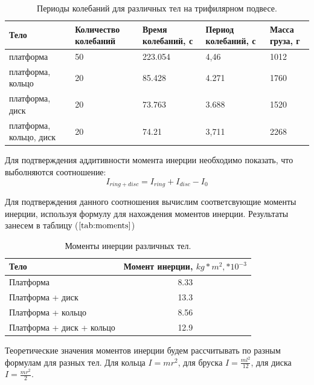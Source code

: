 \documentclass[a4paper,12pt]{article} %
\begin{document}
\begin{table}[ht!]
\begin{center}
\begin{tabular}{| p{65pt} | p{65pt} | p{55pt} | p{60pt}  | p{60pt} |}
					\hline
					Тело & Количество колебаний & Время колебаний, с & Период колебаний, с & Масса груза, г \\ \hline
					платформа & 50 & 223.054 & 4,46 & 1012 \\ \hline
					платформа, кольцо & 20 & 85.428 & 4.271 & 1760 \\ \hline
					платформа, диск & 20 & 73.763 & 3.688 & 1520 \\ \hline
					платформа, кольцо, диск & 20 & 74.21 & 3,711 & 2268 \\
					\hline
\end{tabular}
\end{center} 
\caption{Периоды колебаний для различных тел на трифилярном подвесе.}
\label{tab:periods_diff_body}
\end{table}
		
		Для подтверждения аддитивности момента инерции необходимо показать, что выболняются соотношение:
		$$ I_{ring + disc} = I_{ring} + I_{disc} - I_{0} $$
		
		Для подтверждения данного соотношения вычислим соответсвующие моменты инерции, используя формулу для нахождения моментов инерции. Результаты занесем в таблицу ($\ref{tab:moments}$)
		
\begin{table}[h!]
\begin{center}
\begin{tabular}{| l | c |}
				\hline
				Тело & Момент инерции, $kg*m^{2}, * 10^{-3}$ \\ \hline
				Платформа & 8.33 \\ \hline
				Платформа + диск & 13.3 \\ \hline
				Платформа + кольцо & 8.56 \\ \hline
				Платформа + диск + кольцо & 12.9 \\ \hline
\end{tabular}
\caption{Моменты инерции различных тел.}
\label{tab:moments}
\end{center}					
\end{table}

Теоретические значения моментов инерции будем рассчитывать по разным формулам для разных тел. Для кольца $I = mr^2$, для бруска $I = \frac{ml^2}{12}$, для диска $I = \frac{mr^2}{2}$.
		
\end{document}

